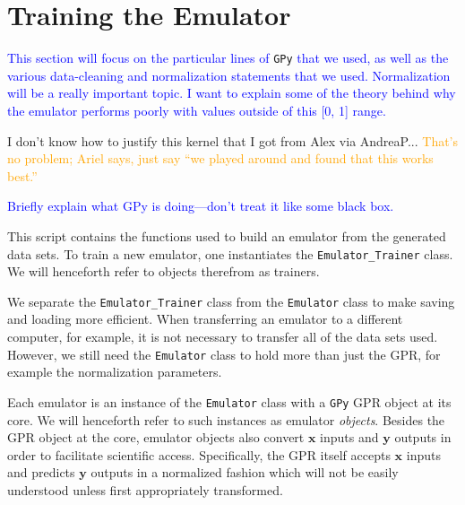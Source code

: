 \section{Training the Emulator}
\label{sec: train_emu}


\textcolor{blue}{This section will focus on the particular lines of}
\verb|GPy| \textcolor{blue}{that we used, as well
as the various data-cleaning and normalization statements that we used.
Normalization will be a really important topic. I want to explain some of
the theory behind why the emulator performs poorly with values outside of this
[0, 1] range.}

I don't know how to justify this kernel that I got from Alex via AndreaP...
\textcolor{orange}{That's no problem; Ariel says, just say ``we played around
and found that this works best.''}

\textcolor{blue}{Briefly explain what GPy is doing—don’t treat it like some black box.}

This script contains the functions used to build an emulator from the 
generated data sets. To train a new emulator, one instantiates the
\verb|Emulator_Trainer| class. We will henceforth refer to objects therefrom 
as trainers.

We separate the \verb|Emulator_Trainer| class from the \verb|Emulator| class
to make saving and loading more efficient. When transferring an emulator to a
different computer, for example, it is not necessary to transfer all of the
data sets used.
However, we still need the \verb|Emulator| class to hold more than just the 
GPR, for example the normalization parameters.

Each emulator is an instance of
the \verb|Emulator| class with a \verb|GPy| GPR object at its core. We will 
henceforth refer to such instances as emulator \textit{objects}. Besides the 
GPR object at the core, emulator objects also convert $\bm{x}$ inputs and
$\bm{y}$ outputs in order to facilitate scientific access. Specifically, 
the GPR itself accepts $\bm{x}$ inputs and predicts $\bm{y}$ outputs 
in a normalized fashion which will not be easily understood unless first 
appropriately transformed.

